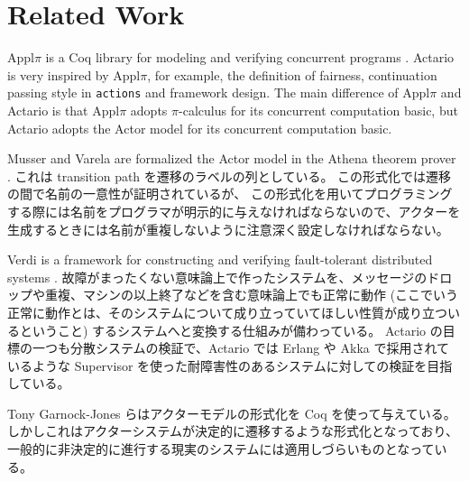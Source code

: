 \section{Related Work}

Appl\(\pi\) is a Coq library for modeling and verifying concurrent programs \cite{Affeldt200817}.
Actario is very inspired by Appl\(\pi\), for example, the definition of fairness, continuation passing style in \texttt{actions} and framework design.
The main difference of Appl\(\pi\) and Actario is that Appl\(\pi\) adopts \(\pi\)-calculus for its concurrent computation basic, but Actario adopts the Actor model for its concurrent computation basic.

Musser and Varela are formalized the Actor model in the Athena theorem prover \cite{Musser:2013aa}.
これは transition path を遷移のラベルの列としている。
この形式化では遷移の間で名前の一意性が証明されているが、 %
この形式化を用いてプログラミングする際には名前をプログラマが明示的に与えなければならないので、アクターを生成するときには名前が重複しないように注意深く設定しなければならない。

Verdi is a framework for constructing and verifying fault-tolerant distributed systems \cite{Verdi}.
故障がまったくない意味論上で作ったシステムを、メッセージのドロップや重複、マシンの以上終了などを含む意味論上でも正常に動作 (ここでいう正常に動作とは、そのシステムについて成り立っていてほしい性質が成り立ついるということ) するシステムへと変換する仕組みが備わっている。
Actario の目標の一つも分散システムの検証で、Actario では Erlang や Akka で採用されているような Supervisor を使った耐障害性のあるシステムに対しての検証を目指している。

Tony Garnock-Jones らはアクターモデルの形式化を Coq を使って与えている。
しかしこれはアクターシステムが決定的に遷移するような形式化となっており、一般的に非決定的に進行する現実のシステムには適用しづらいものとなっている。
